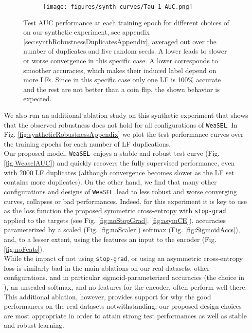 \documentclass{article}
\newcommand{\weasel}{\texttt{WeaSEL}}\newcommand{\brackets}[1]{\left( #1 \right)}
\begin{document}
\begin{figure}
    \begin{subfigure}{.99\textwidth}
      \centering
      \texttt{[image: figures/synth\_curves/Tau\_1\_AUC.png]}
      \label{fig:synthRobustnessTau1Log}
    \end{subfigure}\caption{
    Test AUC performance at each training epoch for different choices of  on our synthetic experiment, see appendix \ref{sec:synthRobustnessDuplicatesAppendix}, averaged out over the number of duplicates and five random seeds. 
    A lower  leads to slower or worse convergence in this specific case. A lower  corresponds to smoother accuracies, which makes their induced label depend on more LFs. Since in this specific case only one LF is 100\% accurate and the rest are not better than a coin flip, the shown behavior is expected.
    }
  \label{fig:synthRobustnessTau1}
\end{figure} 
We also run an additional ablation study on this synthetic experiment that shows that the observed robustness does not hold for all configurations of \weasel. 
In Fig. \ref{fig:syntheticRobustnessAppendix} we plot the test performance curves over the training epochs for each number of LF duplications.
\\
Our proposed model, \weasel\ enjoys a stable and robust test curve (Fig. \ref{fig:WeaselAUC}) and quickly recovers the fully supervised performance, even with 2000 LF duplicates (although convergence becomes slower as the LF set contains more duplicates).
On the other hand, we find that many other configurations and designs of \weasel\ lead to less robust and worse converging curves, collapses or bad performances.
Indeed, for this experiment it is key to use as the loss function the proposed symmetric cross-entropy with \texttt{stop-grad} applied to the targets (see Fig. \ref{fig:noStopGrad}, \ref{fig:asymCE}), accuracies parameterized by a scaled (Fig. \ref{fig:noScaler}) softmax (Fig. \ref{fig:SigmoidAccs}), and, to a lesser extent, using the features an input to the encoder (Fig. \ref{fig:noFeats}).
\\
While the impact of not using \texttt{stop-grad}, or using an asymmetric cross-entropy loss is similarly bad in the main ablations on our real datasets, other configurations, and in particular sigmoid-parameterized accuracies (the choice in \cite{astra}), an unscaled softmax, and no features for the encoder, often perform well there.
This additional ablation, however, provides support for why the good performances on the real datasets notwithstanding, our proposed design choices are most appropriate in order to attain strong test performances as well as stable and robust learning.
\end{document}
